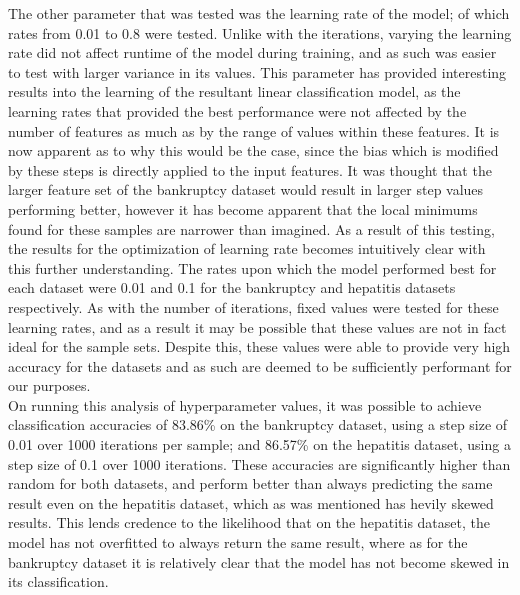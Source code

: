 \newpage

The other parameter that was tested was the learning rate of the model; of which rates from 0.01 to 0.8 were tested. Unlike with the iterations, varying the learning rate did not affect runtime of the model during training, and as such was easier to test with larger variance in its values. This parameter has provided interesting results into the learning of the resultant linear classification model, as the learning rates that provided the best performance were not affected by the number of features as much as by the range of values within these features. It is now apparent as to why this would be the case, since the bias which is modified by these steps is directly applied to the input features. It was thought that the larger feature set of the bankruptcy dataset would result in larger step values performing better, however it has become apparent that the local minimums found for these samples are narrower than imagined. As a result of this testing, the results for the optimization of learning rate becomes intuitively clear with this further understanding. The rates upon which the model performed best for each dataset were 0.01 and 0.1 for the bankruptcy and hepatitis datasets respectively. As with the number of iterations, fixed values were tested for these learning rates, and as a result it may be possible that these values are not in fact ideal for the sample sets. Despite this, these values were able to provide very high accuracy for the datasets and as such are deemed to be sufficiently performant for our purposes.\\

On running this analysis of hyperparameter values, it was possible to achieve classification accuracies of 83.86\% on the bankruptcy dataset, using a step size of 0.01 over 1000 iterations per sample; and 86.57\% on the hepatitis dataset, using a step size of 0.1 over 1000 iterations. These accuracies are significantly higher than random for both datasets, and perform better than always predicting the same result even on the hepatitis dataset, which as was mentioned has hevily skewed results. This lends credence to the likelihood that on the hepatitis dataset, the model has not overfitted to always return the same result, where as for the bankruptcy dataset it is relatively clear that the model has not become skewed in its classification.\\

